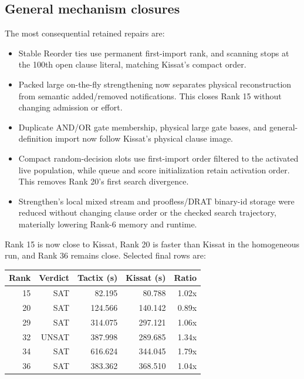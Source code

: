 \documentclass[11pt]{article}
\begin{document}
\subsection{General mechanism closures}

The most consequential retained repairs are:

\begin{itemize}
\item Stable Reorder ties use permanent first-import rank, and scanning stops
  at the 100th open clause literal, matching Kissat's compact order.
\item Packed large on-the-fly strengthening now separates physical
  reconstruction from semantic added/removed notifications.  This closes
  Rank 15 without changing admission or effort.
\item Duplicate AND/OR gate membership, physical large gate bases, and
  general-definition import now follow Kissat's physical clause image.
\item Compact random-decision slots use first-import order filtered to the
  activated live population, while queue and score initialization retain
  activation order.  This removes Rank 20's first search divergence.
\item Strengthen's local mixed stream and proofless/DRAT binary-id storage were
  reduced without changing clause order or the checked search trajectory,
  materially lowering Rank-6 memory and runtime.
\end{itemize}

Rank 15 is now close to Kissat, Rank 20 is faster than Kissat in the homogeneous
run, and Rank 36 remains close.  Selected final rows are:

\begin{center}
\begin{tabular}{rrrrr}
\toprule
Rank & Verdict & Tactix (s) & Kissat (s) & Ratio \\
\midrule
15 & SAT & 82.195 & 80.788 & 1.02x \\
20 & SAT & 124.566 & 140.142 & 0.89x \\
29 & SAT & 314.075 & 297.121 & 1.06x \\
32 & UNSAT & 387.998 & 289.685 & 1.34x \\
34 & SAT & 616.624 & 344.045 & 1.79x \\
36 & SAT & 383.362 & 368.510 & 1.04x \\
\bottomrule
\end{tabular}
\end{center}
\end{document}
